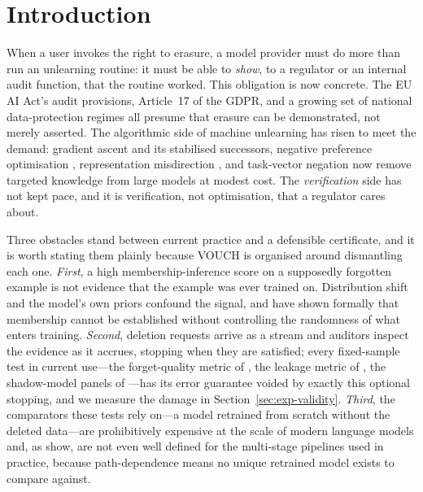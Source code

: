\documentclass[pdflatex,sn-mathphys-num]{sn-jnl}
\theoremstyle{thmstyleone}
\theoremstyle{thmstyletwo}
\theoremstyle{thmstylethree}
\begin{document}

\maketitle

\section{Introduction}\label{sec:intro}

When a user invokes the right to erasure, a model provider must do more than run an
unlearning routine: it must be able to \emph{show}, to a regulator or an internal audit
function, that the routine worked. This obligation is now concrete. The EU AI Act's
audit provisions, Article~17 of the GDPR, and a growing set of national data-protection
regimes all presume that erasure can be demonstrated, not merely asserted. The
algorithmic side of machine unlearning has risen to meet the demand: gradient ascent
and its stabilised successors, negative preference optimisation
\citep{zhang2024npo,fan2025simnpo}, representation misdirection \citep{li2024wmdp},
and task-vector negation now remove targeted knowledge from large models
at modest cost. The \emph{verification} side has not kept pace, and it is verification,
not optimisation, that a regulator cares about.

Three obstacles stand between current practice and a defensible certificate, and it is
worth stating them plainly because VOUCH is organised around dismantling each one.
\emph{First}, a high membership-inference score on a supposedly forgotten example is
not evidence that the example was ever trained on. Distribution shift and the model's
own priors confound the signal, and \citet{zhang2024mia} have shown formally that
membership cannot be established without controlling the randomness of what enters
training. \emph{Second}, deletion requests arrive as a stream and auditors inspect the
evidence as it accrues, stopping when they are satisfied; every fixed-sample test in
current use---the forget-quality metric of \citet{maini2024tofu}, the leakage metric of
\citet{shi2024muse}, the shadow-model panels of \citet{hayes2024inexact}---has its
error guarantee voided by exactly this optional stopping, and we measure the damage in
Section~\ref{sec:exp-validity}. \emph{Third}, the comparators these tests rely on---a
model retrained from scratch without the deleted data---are prohibitively expensive at
the scale of modern language models and, as \citet{yu2025impossibility} show, are not
even well defined for the multi-stage pipelines used in practice, because
path-dependence means no unique retrained model exists to compare against.
\end{document}

